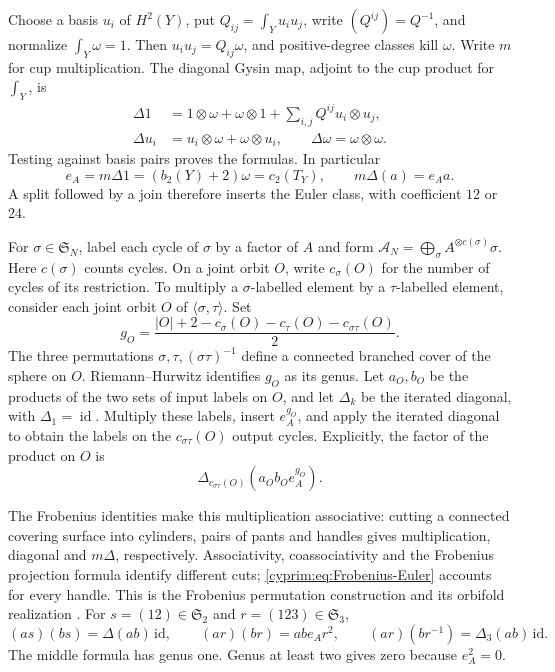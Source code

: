 Choose a basis $u_i$ of $H^2(Y)$, put
$Q_{ij}=\int_Yu_iu_j$, write $(Q^{ij})=Q^{-1}$,
and normalize $\int_Y\omega=1$.
Then $u_iu_j=Q_{ij}\omega$, and positive-degree classes
kill $\omega$. Write $m$ for cup multiplication. The diagonal
Gysin map, adjoint to the cup
product for $\int_Y$, is
\begin{equation}\label{cyprim:eq:Frobenius-diagonal}
\begin{split}
 \Delta1&=1\otimes\omega+\omega\otimes1
                  +\sum_{i,j}Q^{ij}u_i\otimes u_j,\\
 \Delta u_i&=u_i\otimes\omega+\omega\otimes u_i,
 \qquad \Delta\omega=\omega\otimes\omega.
\end{split}
\end{equation}
Testing against basis pairs proves the formulas. In
particular
\begin{equation}\label{cyprim:eq:Frobenius-Euler}
 e_A=m\Delta1=(b_2(Y)+2)\omega=c_2(T_Y),
 \qquad m\Delta(a)=e_Aa.
\end{equation}
A split followed by a join therefore inserts the Euler
class, with coefficient $12$ or $24$.

For $\sigma\in\mathfrak S_N$, label each cycle of
$\sigma$ by a factor of $A$ and form
$\mathscr A_N=\bigoplus_\sigma A^{\otimes c(\sigma)}\sigma$.
Here $c(\sigma)$ counts cycles. On a joint orbit $O$,
write $c_\sigma(O)$ for the number of cycles of its restriction.
To multiply a $\sigma$-labelled element by a
$\tau$-labelled element, consider each joint orbit $O$ of
$\langle\sigma,\tau\rangle$. Set
\[
 g_O=\frac{|O|+2-c_\sigma(O)-c_\tau(O)
                         -c_{\sigma\tau}(O)}2.
\]
The three permutations $\sigma,\tau,(\sigma\tau)^{-1}$
define a connected branched cover of the sphere on $O$.
Riemann--Hurwitz identifies $g_O$ as its genus.
Let $a_O,b_O$ be the products of the two sets of input
labels on $O$, and let $\Delta_k$ be the iterated diagonal,
with $\Delta_1=\operatorname{id}$. Multiply these labels, insert $e_A^{g_O}$,
and apply the iterated diagonal to obtain the labels on
the $c_{\sigma\tau}(O)$ output cycles. Explicitly, the
factor of the product on $O$ is
\begin{equation}\label{cyprim:eq:graph-product}
 \Delta_{c_{\sigma\tau}(O)}(a_Ob_Oe_A^{g_O}).
\end{equation}

The Frobenius identities make this multiplication associative:
cutting a connected covering surface into cylinders, pairs
of pants and handles gives multiplication, diagonal and
$m\Delta$, respectively. Associativity, coassociativity and
the Frobenius projection formula identify different cuts;
\eqref{cyprim:eq:Frobenius-Euler} accounts for every handle.
This is the Frobenius permutation construction and its
orbifold realization \cite[\S2]{rewriteLS2003}
\cite[\S~3]{rewriteFG2003}. For $s=(12)\in\mathfrak S_2$
and $r=(123)\in\mathfrak S_3$,
\[
 (as)(bs)=\Delta(ab)\,\mathrm{id},\qquad
 (ar)(br)=abe_A r^2,
 \qquad (ar)(br^{-1})=\Delta_3(ab)\,\mathrm{id}.
\]
The middle formula has genus one. Genus at least two gives
zero because $e_A^2=0$.

